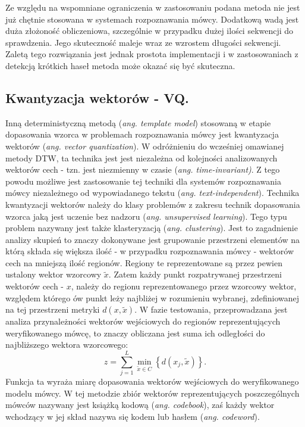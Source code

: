 Ze względu na wspomniane ograniczenia w zastosowaniu podana metoda nie jest już chętnie stosowana w systemach rozpoznawania mówcy. Dodatkową wadą jest duża złożoność obliczeniowa, szczególnie w przypadku dużej ilości sekwencji do sprawdzenia. Jego skuteczność maleje wraz ze wzrostem długości sekwencji. Zaletą tego rozwiązania jest jednak prostota implementacji i w zastosowaniach z detekcją krótkich haseł metoda może okazać się być skuteczna.

\subsection{Kwantyzacja wektorów - VQ.}

Inną deterministyczną metodą (\textit{ang. template model}) stosowaną w etapie dopasowania wzorca w problemach rozpoznawania mówcy jest kwantyzacja wektorów (\textit{ang. vector quantization}). W odróżnieniu do wcześniej omawianej metody DTW, ta technika jest jest niezależna od kolejności analizowanych wektorów cech - tzn. jest niezmienny w czasie (\textit{ang. time-invariant)}. Z tego powodu możliwe jest zastosowanie tej techniki dla systemów rozpoznawania mówcy niezależnego od wypowiadanego tekstu (\textit{ang. text-independent}). 
Technika kwantyzacji wektorów należy do klasy problemów z zakresu technik dopasowania wzorca jaką jest uczenie bez nadzoru  (\textit{ang. unsupervised learning}). Tego typu problem nazywany jest także \cite{fosr} klasteryzacją (\textit{ang. clustering}). Jest to zagadnienie analizy skupień to znaczy dokonywane jest grupowanie przestrzeni elementów na którą składa się większa ilość - w przypadku rozpoznawania mówcy - wektorów cech na mniejszą ilość regionów. Regiony te reprezentowane są przez pewien ustalony wektor wzorcowy $ \tilde{x}$. Zatem każdy punkt rozpatrywanej przestrzeni wektorów cech - $x$, należy do regionu reprezentowanego przez wzorcowy wektor, względem którego ów punkt leży najbliżej w rozumieniu wybranej, zdefiniowanej na tej przestrzeni metryki $d(x,\tilde{x})$.
W fazie testowania, przeprowadzana jest analiza przynależności wektorów wejściowych do regionów reprezentujących weryfikowanego mówcę, to znaczy obliczana jest suma ich odległości do najbliższego wektora wzorcowego:
\begin{equation}
  z = \sum_{j=1}^{L} \min_{\tilde{x} \in  C} \left\{ d(x_j, \tilde{x}) \right\}. 
\end{equation}
Funkcja ta wyraża miarę dopasowania wektorów wejściowych do weryfikowanego modelu mówcy. 
W tej metodzie zbiór wektorów reprezentujących poszczególnych mówców nazywany jest książką kodową (\textit{ang. codebook}), zaś każdy wektor wchodzący w jej skład nazywa się kodem lub hasłem (\textit{ang. codeword}).

